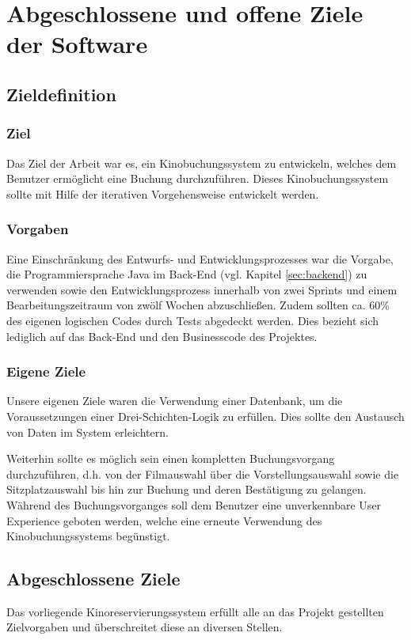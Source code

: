 \section{Abgeschlossene und offene Ziele der Software}
\multipleauthorsection{\authorRF}{\authorEJ}
\label{sec:ziele}
\subsection{Zieldefinition}
\subsubsection*{Ziel}
Das Ziel der Arbeit war es, ein Kinobuchungssystem zu entwickeln, welches dem Benutzer ermöglicht eine Buchung durchzuführen.
Dieses Kinobuchungssystem sollte mit Hilfe der iterativen Vorgehensweise entwickelt werden.
\subsubsection*{Vorgaben}
Eine Einschränkung des Entwurfs- und Entwicklungsprozesses war die Vorgabe, die Programmiersprache Java im Back-End (vgl. Kapitel \vref{sec:backend}) zu verwenden sowie den Entwicklungsprozess innerhalb von zwei Sprints und einem Bearbeitungszeitraum von zwölf Wochen abzuschließen.
Zudem sollten ca. 60\% des eigenen logischen Codes durch Tests abgedeckt werden. Dies bezieht sich lediglich auf das Back-End und den Businesscode des Projektes.

\subsubsection*{Eigene Ziele}
Unsere eigenen Ziele waren die Verwendung einer Datenbank, um die Voraussetzungen einer Drei-Schichten-Logik zu erfüllen.
Dies sollte den Austausch von Daten im System erleichtern.

Weiterhin sollte es möglich sein einen kompletten Buchungsvorgang durchzuführen, d.h. von der Filmauswahl über die Vorstellungsauswahl sowie die Sitzplatzauswahl bis hin zur Buchung und deren Bestätigung zu gelangen.
Während des Buchungsvorganges soll dem Benutzer eine unverkennbare User Experience geboten werden, welche eine erneute Verwendung des Kinobuchungssystems begünstigt.

\subsection{Abgeschlossene Ziele}
\label{ssec:abgeschlossene_ziele}
Das vorliegende Kinoreservierungssystem erfüllt alle an das Projekt gestellten Zielvorgaben und überschreitet diese an diversen Stellen. 

